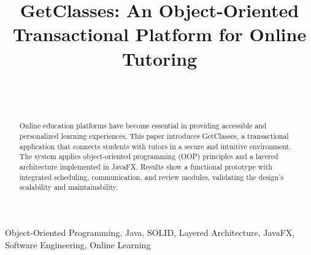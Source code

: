 \documentclass[conference]{IEEEtran}
\begin{document}
\title{GetClasses: An Object-Oriented Transactional Platform for Online Tutoring}

\author{
    \and
    
   
    \\\\[-0.8em]
    
    
}




\maketitle

\begin{abstract}
Online education platforms have become essential in providing accessible and personalized learning experiences. This paper introduces GetClasses, a transactional application that connects students with tutors in a secure and intuitive environment. The system applies object-oriented programming (OOP) principles and a layered architecture implemented in JavaFX. Results show a functional prototype with integrated scheduling, communication, and review modules, validating the design’s scalability and maintainability.
\end{abstract}

\begin{IEEEkeywords}
Object-Oriented Programming, Java, SOLID, Layered Architecture, JavaFX, Software Engineering, Online Learning
\end{IEEEkeywords}
\end{document}
